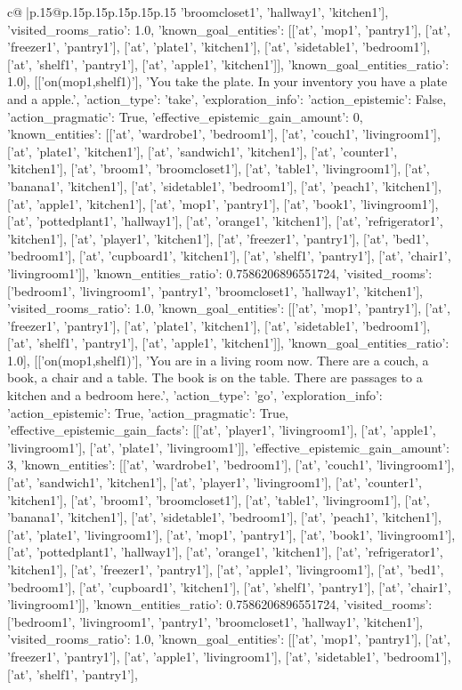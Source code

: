 \documentclass{article}
\begin{document}
{\begin{supertabular}{c@{$\;$}|p{.15\linewidth}@{}p{.15\linewidth}p{.15\linewidth}p{.15\linewidth}p{.15\linewidth}p{.15\linewidth}}
{{{'broomcloset1', 'hallway1', 'kitchen1'], 'visited_rooms_ratio': 1.0, 'known_goal_entities': [['at', 'mop1', 'pantry1'], ['at', 'freezer1', 'pantry1'], ['at', 'plate1', 'kitchen1'], ['at', 'sidetable1', 'bedroom1'], ['at', 'shelf1', 'pantry1'], ['at', 'apple1', 'kitchen1']], 'known_goal_entities_ratio': 1.0}}], [['on(mop1,shelf1)'], 'You take the plate. In your inventory you have a plate and a apple.', {'action_type': 'take', 'exploration_info': {'action_epistemic': False, 'action_pragmatic': True, 'effective_epistemic_gain_amount': 0, 'known_entities': [['at', 'wardrobe1', 'bedroom1'], ['at', 'couch1', 'livingroom1'], ['at', 'plate1', 'kitchen1'], ['at', 'sandwich1', 'kitchen1'], ['at', 'counter1', 'kitchen1'], ['at', 'broom1', 'broomcloset1'], ['at', 'table1', 'livingroom1'], ['at', 'banana1', 'kitchen1'], ['at', 'sidetable1', 'bedroom1'], ['at', 'peach1', 'kitchen1'], ['at', 'apple1', 'kitchen1'], ['at', 'mop1', 'pantry1'], ['at', 'book1', 'livingroom1'], ['at', 'pottedplant1', 'hallway1'], ['at', 'orange1', 'kitchen1'], ['at', 'refrigerator1', 'kitchen1'], ['at', 'player1', 'kitchen1'], ['at', 'freezer1', 'pantry1'], ['at', 'bed1', 'bedroom1'], ['at', 'cupboard1', 'kitchen1'], ['at', 'shelf1', 'pantry1'], ['at', 'chair1', 'livingroom1']], 'known_entities_ratio': 0.7586206896551724, 'visited_rooms': ['bedroom1', 'livingroom1', 'pantry1', 'broomcloset1', 'hallway1', 'kitchen1'], 'visited_rooms_ratio': 1.0, 'known_goal_entities': [['at', 'mop1', 'pantry1'], ['at', 'freezer1', 'pantry1'], ['at', 'plate1', 'kitchen1'], ['at', 'sidetable1', 'bedroom1'], ['at', 'shelf1', 'pantry1'], ['at', 'apple1', 'kitchen1']], 'known_goal_entities_ratio': 1.0}}], [['on(mop1,shelf1)'], 'You are in a living room now. There are a couch, a book, a chair and a table. The book is on the table. There are passages to a kitchen and a bedroom here.', {'action_type': 'go', 'exploration_info': {'action_epistemic': True, 'action_pragmatic': True, 'effective_epistemic_gain_facts': [['at', 'player1', 'livingroom1'], ['at', 'apple1', 'livingroom1'], ['at', 'plate1', 'livingroom1']], 'effective_epistemic_gain_amount': 3, 'known_entities': [['at', 'wardrobe1', 'bedroom1'], ['at', 'couch1', 'livingroom1'], ['at', 'sandwich1', 'kitchen1'], ['at', 'player1', 'livingroom1'], ['at', 'counter1', 'kitchen1'], ['at', 'broom1', 'broomcloset1'], ['at', 'table1', 'livingroom1'], ['at', 'banana1', 'kitchen1'], ['at', 'sidetable1', 'bedroom1'], ['at', 'peach1', 'kitchen1'], ['at', 'plate1', 'livingroom1'], ['at', 'mop1', 'pantry1'], ['at', 'book1', 'livingroom1'], ['at', 'pottedplant1', 'hallway1'], ['at', 'orange1', 'kitchen1'], ['at', 'refrigerator1', 'kitchen1'], ['at', 'freezer1', 'pantry1'], ['at', 'apple1', 'livingroom1'], ['at', 'bed1', 'bedroom1'], ['at', 'cupboard1', 'kitchen1'], ['at', 'shelf1', 'pantry1'], ['at', 'chair1', 'livingroom1']], 'known_entities_ratio': 0.7586206896551724, 'visited_rooms': ['bedroom1', 'livingroom1', 'pantry1', 'broomcloset1', 'hallway1', 'kitchen1'], 'visited_rooms_ratio': 1.0, 'known_goal_entities': [['at', 'mop1', 'pantry1'], ['at', 'freezer1', 'pantry1'], ['at', 'apple1', 'livingroom1'], ['at', 'sidetable1', 'bedroom1'], ['at', 'shelf1', 'pantry1'], }}}
\end{supertabular}}
\end{document}
